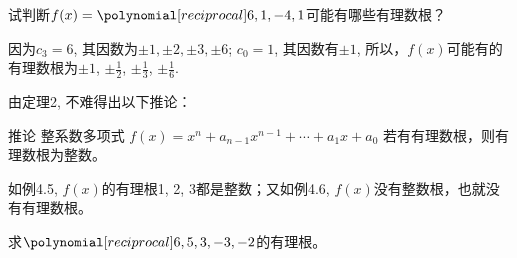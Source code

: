 \begin{example}
    试判断$f(x)=\poly{6,1,-4,1}$可能有哪些有理数根？
\end{example}

\begin{solution}
    因为$c_3=6$, 其因数为$\pm 1,\pm 2,\pm 3,\pm 6$; 
    $c_0=1$, 其因数有$\pm 1$, 所以，$f(x)$可能有的有理数根为$\pm 1$,
    $\pm\frac{1}{2}$, $\pm \frac{1}{3}$, $\pm \frac{1}{6}$.
\end{solution}

由定理2, 不难得出以下推论：

\begin{blk}{推论}
  整系数多项式  $f (x) =x^n+a_{n-1}x^{n-1}+\cdots+a_1x+a_0$ 若有有理数根，则有理数根为整数。
\end{blk}

如例4.5, $f(x)$的有理根1, 2, 3都是整数；又如例4.6,
$f(x)$没有整数根，也就没有有理数根。

\begin{example}
    求$\poly{6,5,3,-3,-2}$的有理根。
\end{example}

